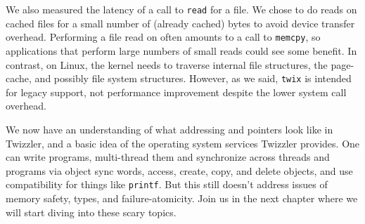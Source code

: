 We also measured the latency of a call to \texttt{read} for a file. We chose to do reads on cached
files for a small number of (already cached) bytes to avoid device transfer overhead. Performing a file read on
\Twizzler often amounts to a call to \texttt{memcpy}, so applications that perform large numbers of
small reads could see some benefit. In contrast, on Linux, the kernel needs to traverse internal
file structures, the page-cache, and possibly file system structures.
However, as we said, \texttt{twix} is intended for legacy
support, not performance improvement despite the lower system call overhead.

\begin{chconc}
    We now have an understanding of what addressing and pointers look like in Twizzler, and a basic idea of the
    operating system services Twizzler provides. One can write programs, multi-thread them and synchronize across
    threads and programs via object sync words, access, create, copy, and
    delete objects, and use \unix compatibility for things like \texttt{printf}. But this still doesn't address issues
    of memory safety, types, and failure-atomicity. Join us in the next chapter where we will start diving into these
    scary topics.
\end{chconc}